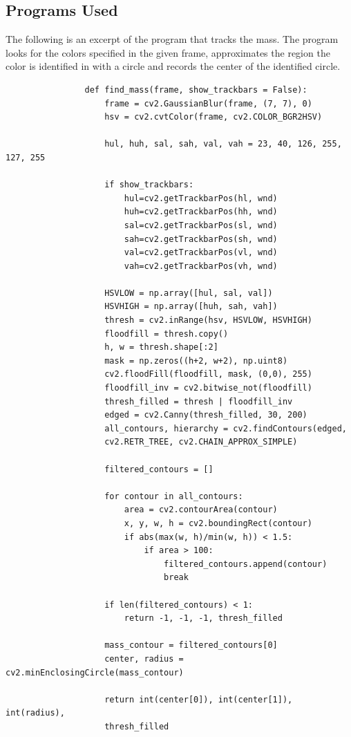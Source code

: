 \documentclass[11pt]{article}
\begin{document}
        \subsection{Programs Used}
            The following is an excerpt of the program that tracks the mass. The program looks for the colors specified in the given frame, approximates the region the color is identified in with a circle and records the center of the identified circle.
            \begin{verbatim}
                def find_mass(frame, show_trackbars = False):
                    frame = cv2.GaussianBlur(frame, (7, 7), 0)
                    hsv = cv2.cvtColor(frame, cv2.COLOR_BGR2HSV)

                    hul, huh, sal, sah, val, vah = 23, 40, 126, 255, 127, 255 

                    if show_trackbars:
                        hul=cv2.getTrackbarPos(hl, wnd)
                        huh=cv2.getTrackbarPos(hh, wnd)
                        sal=cv2.getTrackbarPos(sl, wnd)
                        sah=cv2.getTrackbarPos(sh, wnd)
                        val=cv2.getTrackbarPos(vl, wnd)
                        vah=cv2.getTrackbarPos(vh, wnd)

                    HSVLOW = np.array([hul, sal, val])
                    HSVHIGH = np.array([huh, sah, vah])
                    thresh = cv2.inRange(hsv, HSVLOW, HSVHIGH)
                    floodfill = thresh.copy()
                    h, w = thresh.shape[:2]
                    mask = np.zeros((h+2, w+2), np.uint8)
                    cv2.floodFill(floodfill, mask, (0,0), 255)
                    floodfill_inv = cv2.bitwise_not(floodfill)
                    thresh_filled = thresh | floodfill_inv    
                    edged = cv2.Canny(thresh_filled, 30, 200)
                    all_contours, hierarchy = cv2.findContours(edged, 
                    cv2.RETR_TREE, cv2.CHAIN_APPROX_SIMPLE)

                    filtered_contours = []

                    for contour in all_contours:
                        area = cv2.contourArea(contour)
                        x, y, w, h = cv2.boundingRect(contour)
                        if abs(max(w, h)/min(w, h)) < 1.5:
                            if area > 100:
                                filtered_contours.append(contour) 
                                break

                    if len(filtered_contours) < 1:
                        return -1, -1, -1, thresh_filled

                    mass_contour = filtered_contours[0]
                    center, radius = cv2.minEnclosingCircle(mass_contour)
                    
                    return int(center[0]), int(center[1]), int(radius), 
                    thresh_filled
    \end{verbatim}


    
    
\end{document}
